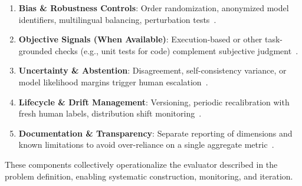 \begin{enumerate}
	\item \textbf{Bias \& Robustness Controls}: Order randomization, anonymized model identifiers, multilingual balancing, perturbation tests~\cite{zheng2023judgelm, hada2024metal, liang2022helm}.
	\item \textbf{Objective Signals (When Available)}: Execution-based or other task-grounded checks (e.g., unit tests for code) complement subjective judgment~\cite{chen2021evaluating, li2024_llmsasjudges}.
	\item \textbf{Uncertainty \& Abstention}: Disagreement, self-consistency variance, or model likelihood margins trigger human escalation~\cite{bavaresco2024judgebench, li2024_llmsasjudges}.
	\item \textbf{Lifecycle \& Drift Management}: Versioning, periodic recalibration with fresh human labels, distribution shift monitoring~\cite{liang2022helm, li2024_llmsasjudges}.
	\item \textbf{Documentation \& Transparency}: Separate reporting of dimensions and known limitations to avoid over-reliance on a single aggregate metric~\cite{liang2022helm, bavaresco2024judgebench}.
\end{enumerate} %

These components collectively operationalize the evaluator described in the problem definition, enabling systematic construction, monitoring, and iteration.